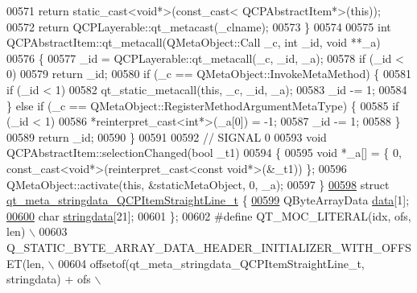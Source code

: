 \begin{DoxyCode}
00571         \textcolor{keywordflow}{return} \textcolor{keyword}{static\_cast<}\textcolor{keywordtype}{void}*\textcolor{keyword}{>}(\textcolor{keyword}{const\_cast<} QCPAbstractItem*\textcolor{keyword}{>}(\textcolor{keyword}{this}));
00572     \textcolor{keywordflow}{return} QCPLayerable::qt\_metacast(\_clname);
00573 \}
00574 
00575 \textcolor{keywordtype}{int} QCPAbstractItem::qt\_metacall(QMetaObject::Call \_c, \textcolor{keywordtype}{int} \_id, \textcolor{keywordtype}{void} **\_a)
00576 \{
00577     \_id = QCPLayerable::qt\_metacall(\_c, \_id, \_a);
00578     \textcolor{keywordflow}{if} (\_id < 0)
00579         \textcolor{keywordflow}{return} \_id;
00580     \textcolor{keywordflow}{if} (\_c == QMetaObject::InvokeMetaMethod) \{
00581         \textcolor{keywordflow}{if} (\_id < 1)
00582             qt\_static\_metacall(\textcolor{keyword}{this}, \_c, \_id, \_a);
00583         \_id -= 1;
00584     \} \textcolor{keywordflow}{else} \textcolor{keywordflow}{if} (\_c == QMetaObject::RegisterMethodArgumentMetaType) \{
00585         \textcolor{keywordflow}{if} (\_id < 1)
00586             *\textcolor{keyword}{reinterpret\_cast<}\textcolor{keywordtype}{int}*\textcolor{keyword}{>}(\_a[0]) = -1;
00587         \_id -= 1;
00588     \}
00589     \textcolor{keywordflow}{return} \_id;
00590 \}
00591 
00592 \textcolor{comment}{// SIGNAL 0}
00593 \textcolor{keywordtype}{void} QCPAbstractItem::selectionChanged(\textcolor{keywordtype}{bool} \_t1)
00594 \{
00595     \textcolor{keywordtype}{void} *\_a[] = \{ 0, \textcolor{keyword}{const\_cast<}\textcolor{keywordtype}{void}*\textcolor{keyword}{>}(\textcolor{keyword}{reinterpret\_cast<}\textcolor{keyword}{const }\textcolor{keywordtype}{void}*\textcolor{keyword}{>}(&\_t1)) \};
00596     QMetaObject::activate(\textcolor{keyword}{this}, &staticMetaObject, 0, \_a);
00597 \}
\hypertarget{a00016_source_l00598}{}\hyperlink{a00016}{00598} \textcolor{keyword}{struct }\hyperlink{a00016_dd/d6d/a00111}{qt\_meta\_stringdata\_QCPItemStraightLine\_t} \{
\hypertarget{a00016_source_l00599}{}\hyperlink{a00016_a86cfd75cdbd69fb7bac81f44368368a2}{00599}     QByteArrayData \hyperlink{a00016_a86cfd75cdbd69fb7bac81f44368368a2}{data}[1];
\hypertarget{a00016_source_l00600}{}\hyperlink{a00016_a4fcd4918ec3f5999a6ee9ce08ebcdb96}{00600}     \textcolor{keywordtype}{char} \hyperlink{a00016_a4fcd4918ec3f5999a6ee9ce08ebcdb96}{stringdata}[21];
00601 \};
00602 \textcolor{preprocessor}{#define QT\_MOC\_LITERAL(idx, ofs, len) \(\backslash\)}
00603 \textcolor{preprocessor}{    Q\_STATIC\_BYTE\_ARRAY\_DATA\_HEADER\_INITIALIZER\_WITH\_OFFSET(len, \(\backslash\)}
00604 \textcolor{preprocessor}{    offsetof(qt\_meta\_stringdata\_QCPItemStraightLine\_t, stringdata) + ofs \(\backslash\)}

\end{DoxyCode}
